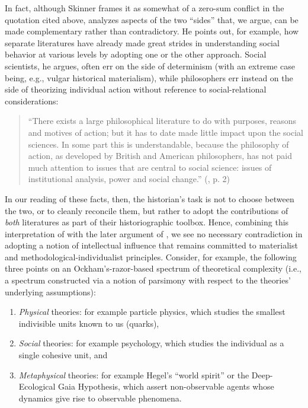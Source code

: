 \documentclass[11pt]{article}
\begin{document}
In fact, although Skinner frames it as somewhat of a zero-sum conflict in the quotation cited above, \cite{giddens_central_1979} analyzes aspects of the two ``sides'' that, we argue, can be made complementary rather than contradictory. He points out, for example, how separate literatures have already made great strides in understanding social behavior at various levels by adopting one or the other approach. Social scientists, he argues, often err on the side of determinism (with an extreme case being, e.g., vulgar historical materialism), while philosophers err instead on the side of theorizing individual action without reference to social-relational considerations:
\begin{quote}
	``There exists a large philosophical literature to do with purposes, reasons and motives of action; but it has to date made little impact upon the social sciences. In some part this is understandable, because the philosophy of action, as developed by British and American philosophers, has not paid much attention to issues that are central to social science: issues of institutional analysis, power and social change.'' (\cite{giddens_central_1979}, p. 2)
\end{quote}
In our reading of these facts, then, the historian's task is not to choose between the two, or to cleanly reconcile them, but rather to adopt the contributions of \textit{both} literatures as part of their historiographic toolbox. Hence, combining this interpretation of \cite{giddens_central_1979} with the later argument of \cite{sperber_explaining_1996}, we see no necessary contradiction in adopting a notion of intellectual influence that remains committed to materialist and methodological-individualist principles. Consider, for example, the following three points on an Ockham's-razor-based spectrum of theoretical complexity (i.e., a spectrum constructed via a notion of parsimony with respect to the theories' underlying assumptions):
\begin{enumerate}
	\item \textit{Physical} theories: for example particle physics, which studies the smallest indivisible units known to us (quarks),
	\item \textit{Social} theories: for example psychology, which studies the individual as a single cohesive unit, and 
	\item \textit{Metaphysical} theories: for example Hegel's ``world spirit'' or the Deep-Ecological Gaia Hypothesis, which assert non-observable agents whose dynamics give rise to observable phenomena.
\end{enumerate}
\end{document}
